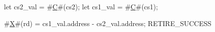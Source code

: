let cs2_val = #\hyperref[sailRISCVzC]{C}#(cs2);
let cs1_val = #\hyperref[sailRISCVzC]{C}#(cs1);

#\hyperref[sailRISCVzX]{X}#(rd) = cs1_val.address - cs2_val.address;
RETIRE_SUCCESS
